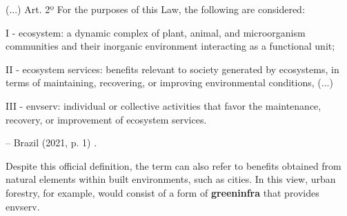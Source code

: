 \documentclass[./main_en.tex]{subfiles}
\begin{document}
\begin{adjustwidth}{100pt}{0pt}
\medskip
\small 
(...)
Art. 2º For the purposes of this Law, the following are considered:

I - ecosystem: a dynamic complex of plant, animal, and microorganism communities and their inorganic environment interacting as a functional unit; 

II - ecosystem services: benefits relevant to society generated by ecosystems, in terms of maintaining, recovering, or improving environmental conditions, (...)

III - \gls{envserv}: individual or collective activities that favor the maintenance, recovery, or improvement of ecosystem services.

-- Brazil (2021, p. 1) \cite{brasil2021}.
\medskip
\end{adjustwidth}

\noindent Despite this official definition, the term  can also refer to benefits obtained from natural elements within built environments, such as cities. In this view, urban forestry, for example, would consist of a form of \textbf{\gls{greeninfra}} that provides \gls{envserv}.
\end{document}
